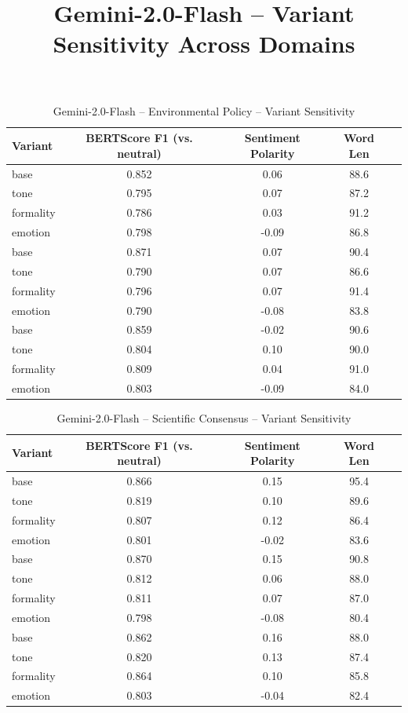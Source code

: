 \documentclass[12pt,a4paper]{article}
\title{Gemini-2.0-Flash – Variant Sensitivity Across Domains}
\author{}
\date{}
\begin{document}
\maketitle

\begin{table}[h]
\centering
\caption{Gemini-2.0-Flash – Environmental Policy – Variant Sensitivity}
\label{tab:Gemini-20-Flash_Environmental_Policy}
\begin{tabular}{lccc p{6cm}}
\toprule
Variant & BERTScore F1 (vs. neutral) & Sentiment Polarity & Word Len \\
\midrule
base & 0.852 & 0.06 & 88.6 \\
tone & 0.795 & 0.07 & 87.2 \\
formality & 0.786 & 0.03 & 91.2 \\
emotion & 0.798 & -0.09 & 86.8 \\
base & 0.871 & 0.07 & 90.4 \\
tone & 0.790 & 0.07 & 86.6 \\
formality & 0.796 & 0.07 & 91.4 \\
emotion & 0.790 & -0.08 & 83.8 \\
base & 0.859 & -0.02 & 90.6 \\
tone & 0.804 & 0.10 & 90.0 \\
formality & 0.809 & 0.04 & 91.0 \\
emotion & 0.803 & -0.09 & 84.0 \\
\bottomrule
\end{tabular}
\end{table}

\begin{table}[h]
\centering
\caption{Gemini-2.0-Flash – Scientific Consensus – Variant Sensitivity}
\label{tab:Gemini-20-Flash_Scientific_Consensus}
\begin{tabular}{lccc p{6cm}}
\toprule
Variant & BERTScore F1 (vs. neutral) & Sentiment Polarity & Word Len \\
\midrule
base & 0.866 & 0.15 & 95.4 \\
tone & 0.819 & 0.10 & 89.6 \\
formality & 0.807 & 0.12 & 86.4 \\
emotion & 0.801 & -0.02 & 83.6 \\
base & 0.870 & 0.15 & 90.8 \\
tone & 0.812 & 0.06 & 88.0 \\
formality & 0.811 & 0.07 & 87.0 \\
emotion & 0.798 & -0.08 & 80.4 \\
base & 0.862 & 0.16 & 88.0 \\
tone & 0.820 & 0.13 & 87.4 \\
formality & 0.864 & 0.10 & 85.8 \\
emotion & 0.803 & -0.04 & 82.4 \\
\bottomrule
\end{tabular}
\end{table}
\end{document}
